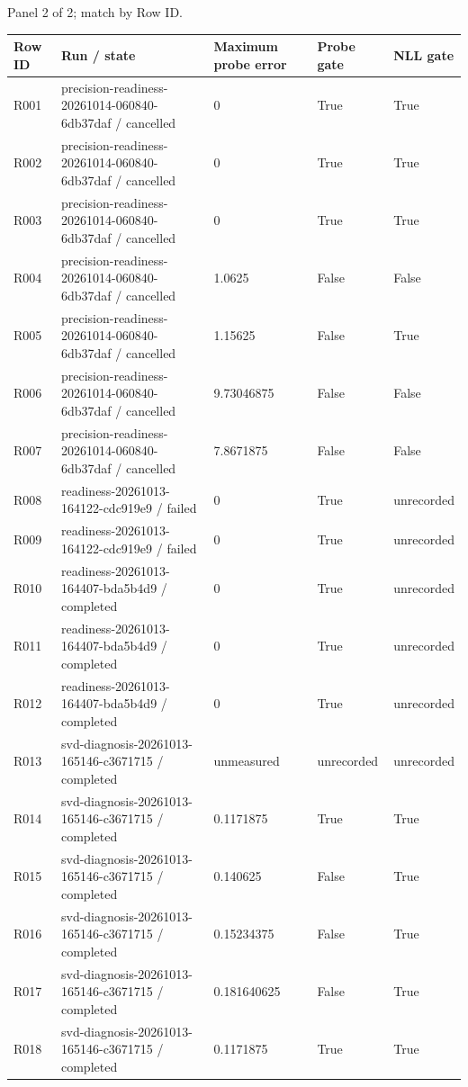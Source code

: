 \documentclass[10pt]{article}
\begin{document}
\par\noindent Panel 2 of 2; match by Row ID.
{\scriptsize\setlength{\tabcolsep}{2pt}
\begin{longtable}{p{}p{}p{}p{}p{}}
Row ID & Run / state & Maximum probe error & Probe gate & NLL gate \\
\hline\endhead
R001 & precision-readiness-20261014-060840-6db37daf / cancelled & 0 & True & True \\
R002 & precision-readiness-20261014-060840-6db37daf / cancelled & 0 & True & True \\
R003 & precision-readiness-20261014-060840-6db37daf / cancelled & 0 & True & True \\
R004 & precision-readiness-20261014-060840-6db37daf / cancelled & 1.0625 & False & False \\
R005 & precision-readiness-20261014-060840-6db37daf / cancelled & 1.15625 & False & True \\
R006 & precision-readiness-20261014-060840-6db37daf / cancelled & 9.73046875 & False & False \\
R007 & precision-readiness-20261014-060840-6db37daf / cancelled & 7.8671875 & False & False \\
R008 & readiness-20261013-164122-cdc919e9 / failed & 0 & True & unrecorded \\
R009 & readiness-20261013-164122-cdc919e9 / failed & 0 & True & unrecorded \\
R010 & readiness-20261013-164407-bda5b4d9 / completed & 0 & True & unrecorded \\
R011 & readiness-20261013-164407-bda5b4d9 / completed & 0 & True & unrecorded \\
R012 & readiness-20261013-164407-bda5b4d9 / completed & 0 & True & unrecorded \\
R013 & svd-diagnosis-20261013-165146-c3671715 / completed & unmeasured & unrecorded & unrecorded \\
R014 & svd-diagnosis-20261013-165146-c3671715 / completed & 0.1171875 & True & True \\
R015 & svd-diagnosis-20261013-165146-c3671715 / completed & 0.140625 & False & True \\
R016 & svd-diagnosis-20261013-165146-c3671715 / completed & 0.15234375 & False & True \\
R017 & svd-diagnosis-20261013-165146-c3671715 / completed & 0.181640625 & False & True \\
R018 & svd-diagnosis-20261013-165146-c3671715 / completed & 0.1171875 & True & True \\
\end{longtable}}
\end{document}
